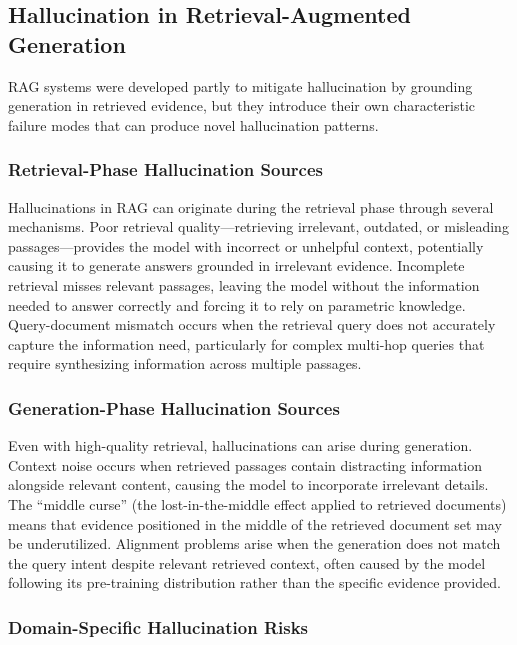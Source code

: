 \documentclass[11pt,letterpaper]{article}
\begin{document}
\subsection{Hallucination in Retrieval-Augmented Generation}

RAG systems were developed partly to mitigate hallucination by grounding generation in retrieved evidence, but they introduce their own characteristic failure modes that can produce novel hallucination patterns.

\subsubsection{Retrieval-Phase Hallucination Sources}

Hallucinations in RAG can originate during the retrieval phase through several mechanisms. Poor retrieval quality---retrieving irrelevant, outdated, or misleading passages---provides the model with incorrect or unhelpful context, potentially causing it to generate answers grounded in irrelevant evidence. Incomplete retrieval misses relevant passages, leaving the model without the information needed to answer correctly and forcing it to rely on parametric knowledge. Query-document mismatch occurs when the retrieval query does not accurately capture the information need, particularly for complex multi-hop queries that require synthesizing information across multiple passages.

\subsubsection{Generation-Phase Hallucination Sources}

Even with high-quality retrieval, hallucinations can arise during generation. Context noise occurs when retrieved passages contain distracting information alongside relevant content, causing the model to incorporate irrelevant details. The ``middle curse'' (the lost-in-the-middle effect applied to retrieved documents) means that evidence positioned in the middle of the retrieved document set may be underutilized. Alignment problems arise when the generation does not match the query intent despite relevant retrieved context, often caused by the model following its pre-training distribution rather than the specific evidence provided.

\subsubsection{Domain-Specific Hallucination Risks}
\end{document}
